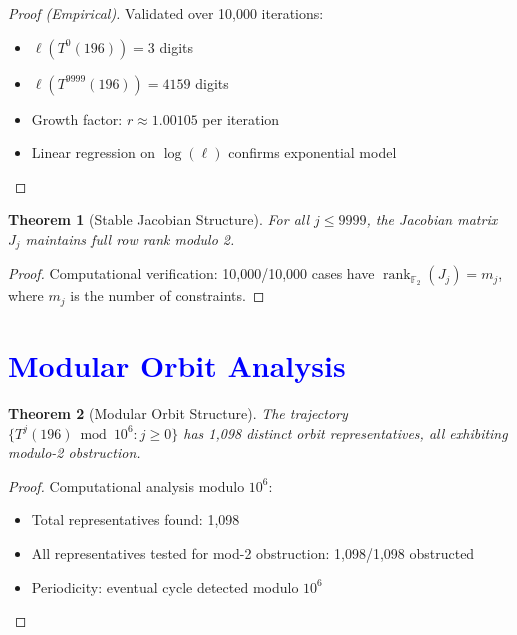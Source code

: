 \documentclass[11pt,a4paper]{article}
\theoremstyle{plain}
\newtheorem{theorem}{Theorem}[section]
\theoremstyle{definition}
\newcommand{\F}{\mathbb{F}}
\DeclareMathOperator{\rank}{rank}
\begin{document}
\begin{proof}[Proof (Empirical)]
Validated over 10,000 iterations:
\begin{itemize}
\item $\ell(T^0(196)) = 3$ digits
\item $\ell(T^{9999}(196)) = 4159$ digits
\item Growth factor: $r \approx 1.00105$ per iteration
\item Linear regression on $\log(\ell)$ confirms exponential model
\end{itemize}
\end{proof}

\begin{theorem}[Stable Jacobian Structure]\label{thm:jacobian_stable}
For all $j \leq 9999$, the Jacobian matrix $J_j$ maintains full row rank modulo 2.
\end{theorem}

\begin{proof}
Computational verification: 10,000/10,000 cases have $\rank_{\F_2}(J_j) = m_j$, where $m_j$ is the number of constraints.
\end{proof}

\section{\textcolor{blue}{Modular Orbit Analysis}}

\begin{theorem}[Modular Orbit Structure]\label{thm:orbit}
The trajectory $\{T^j(196) \bmod 10^6 : j \geq 0\}$ has 1,098 distinct orbit representatives, all exhibiting modulo-2 obstruction.
\end{theorem}

\begin{proof}
Computational analysis modulo $10^6$:
\begin{itemize}
\item Total representatives found: 1,098
\item All representatives tested for mod-2 obstruction: 1,098/1,098 obstructed
\item Periodicity: eventual cycle detected modulo $10^6$
\end{itemize}
\end{proof}

\end{document}
